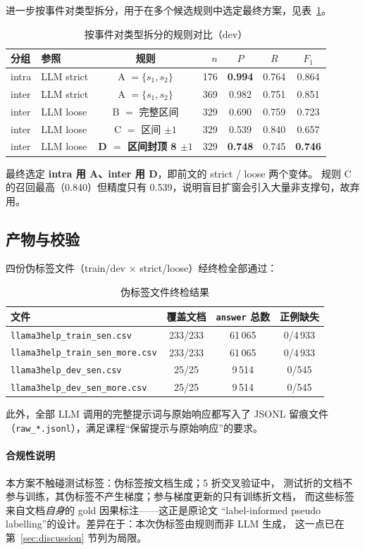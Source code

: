 进一步按事件对类型拆分，用于在多个候选规则中选定最终方案，见表~\ref{tab:reltype}。

\begin{table}[H]
\centering
\caption{按事件对类型拆分的规则对比（dev）}
\label{tab:reltype}
\small
\begin{tabular}{llcrccc}
\toprule
分组 & 参照 & 规则 & $n$ & $P$ & $R$ & $F_1$\\
\midrule
intra & LLM strict & A $=\{s_1,s_2\}$ & 176 & \textbf{0.994} & 0.764 & 0.864\\
inter & LLM strict & A $=\{s_1,s_2\}$ & 369 & 0.982 & 0.751 & 0.851\\
\midrule
inter & LLM loose & B $=$ 完整区间 & 329 & 0.690 & 0.759 & 0.723\\
inter & LLM loose & C $=$ 区间 $\pm1$ & 329 & 0.539 & 0.840 & 0.657\\
inter & LLM loose & \textbf{D $=$ 区间封顶 8 $\pm1$} & 329 & \textbf{0.748} & 0.745 & \textbf{0.746}\\
\bottomrule
\end{tabular}
\end{table}

最终选定 \textbf{intra 用 A、inter 用 D}，即前文的 strict / loose 两个变体。
规则 C 的召回最高（0.840）但精度只有 0.539，说明盲目扩窗会引入大量非支撑句，故弃用。

\subsection{产物与校验}

四份伪标签文件（train/dev $\times$ strict/loose）经终检全部通过：

\begin{table}[H]
\centering
\caption{伪标签文件终检结果}
\label{tab:validate}
\small
\begin{tabular}{lccc}
\toprule
文件 & 覆盖文档 & \texttt{answer} 总数 & 正例缺失\\
\midrule
\texttt{llama3help\_train\_sen.csv} & 233/233 & 61\,065 & 0/4\,933\\
\texttt{llama3help\_train\_sen\_more.csv} & 233/233 & 61\,065 & 0/4\,933\\
\texttt{llama3help\_dev\_sen.csv} & 25/25 & 9\,514 & 0/545\\
\texttt{llama3help\_dev\_sen\_more.csv} & 25/25 & 9\,514 & 0/545\\
\bottomrule
\end{tabular}
\end{table}

此外，全部 LLM 调用的完整提示词与原始响应都写入了 JSONL 留痕文件
（\texttt{raw\_*.jsonl}），满足课程“保留提示与原始响应”的要求。

\paragraph{合规性说明}本方案不触碰测试标签：伪标签按文档生成；5 折交叉验证中，
测试折的文档不参与训练，其伪标签不产生梯度；参与梯度更新的只有训练折文档，
而这些标签来自文档\emph{自身}的 gold 因果标注——这正是原论文
“label-informed pseudo labelling”的设计。差异在于：本次伪标签由规则而非 LLM 生成，
这一点已在第~\ref{sec:discussion} 节列为局限。

